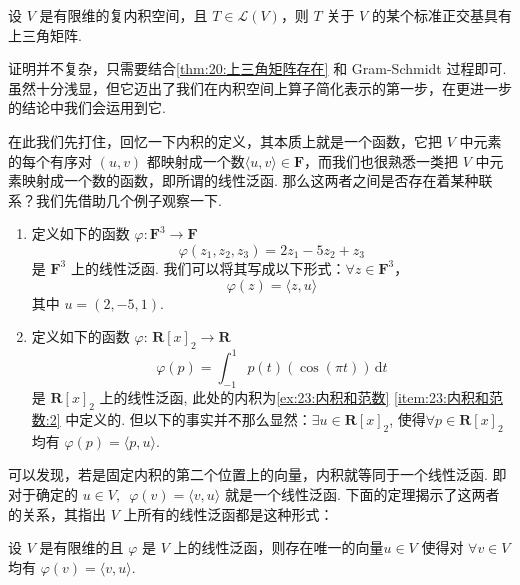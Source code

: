 \begin{theorem} \label{thm:23:Schur}
    设 $ V $ 是有限维的复内积空间，且 $ T \in \mathcal{L}(V) $，则 $ T $ 关于 $ V $ 的某个标准正交基具有上三角矩阵.
\end{theorem}

证明并不复杂，只需要结合\autoref{thm:20:上三角矩阵存在} 和 Gram-Schmidt 过程即可. 虽然十分浅显，但它迈出了我们在内积空间上算子简化表示的第一步，在更进一步的结论中我们会运用到它.

在此我们先打住，回忆一下内积的定义，其本质上就是一个函数，它把 $ V $ 中元素的每个有序对 $(u, v)$ 都映射成一个数$ \langle u, v \rangle \in \mathbf{F}$，而我们也很熟悉一类把 $ V $ 中元素映射成一个数的函数，即所谓的线性泛函. 那么这两者之间是否存在着某种联系？我们先借助几个例子观察一下.

\begin{example}
    \begin{enumerate}
        \item 定义如下的函数 $\varphi : \mathbf{F}^{3} \rightarrow \mathbf{F}$
              \[\varphi(z_1, z_2, z_3) = 2z_1 - 5z_2 + z_3\]
              是 $\mathbf{F}^{3}$ 上的线性泛函. 我们可以将其写成以下形式：$ \forall z \in \mathbf{F}^{3}$，
              \[\varphi(z) = \langle z, u\rangle\]
              其中 $u = (2, -5, 1)$.

        \item 定义如下的函数 $\varphi$: $\mathbf{R}[x]_2 \rightarrow \mathbf{R}$
              \[\varphi(p) = \int_{-1}^1 p(t)(\cos(\pi t))\,\mathrm{d}t\]
              是 $\mathbf{R}[x]_2$ 上的线性泛函, 此处的内积为\autoref{ex:23:内积和范数} \ref*{item:23:内积和范数:2} 中定义的. 但以下的事实并不那么显然：$ \exists u \in \mathbf{R}[x]_2$, 使得$\forall p \in \mathbf{R}[x]_2$ 均有 $ \varphi (p) = \langle p, u\rangle $.
    \end{enumerate}
\end{example}

可以发现，若是固定内积的第二个位置上的向量，内积就等同于一个线性泛函. 即对于确定的 $ u \in V , \enspace \varphi(v) = \langle v, u \rangle$ 就是一个线性泛函. 下面的定理揭示了这两者的关系，其指出 $ V $ 上所有的线性泛函都是这种形式：
\begin{theorem} \label{thm:23:Riesz}
    设 $ V $ 是有限维的且 $ \varphi $ 是 $ V $ 上的线性泛函，则存在唯一的向量$u \in V$ 使得对 $\forall v \in V$ 均有 $ \varphi(v) = \langle v, u\rangle $.
\end{theorem}

